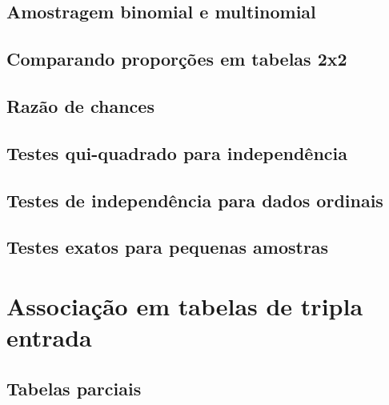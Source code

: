 \documentclass[]{book}
\begin{document}
\hypertarget{amostragem-binomial-e-multinomial}{%
\section{Amostragem binomial e multinomial}\label{amostragem-binomial-e-multinomial}}

\hypertarget{comparando-proporcoes-em-tabelas-2x2}{%
\section{Comparando proporções em tabelas 2x2}\label{comparando-proporcoes-em-tabelas-2x2}}

\hypertarget{razao-de-chances}{%
\section{Razão de chances}\label{razao-de-chances}}

\hypertarget{testes-qui-quadrado-para-independencia}{%
\section{Testes qui-quadrado para independência}\label{testes-qui-quadrado-para-independencia}}

\hypertarget{testes-de-independencia-para-dados-ordinais}{%
\section{Testes de independência para dados ordinais}\label{testes-de-independencia-para-dados-ordinais}}

\hypertarget{testes-exatos-para-pequenas-amostras}{%
\section{Testes exatos para pequenas amostras}\label{testes-exatos-para-pequenas-amostras}}

\hypertarget{associacao-em-tabelas-de-tripla-entrada}{%
\chapter{Associação em tabelas de tripla entrada}\label{associacao-em-tabelas-de-tripla-entrada}}

\hypertarget{tabelas-parciais}{%
\section{Tabelas parciais}\label{tabelas-parciais}}
\end{document}

